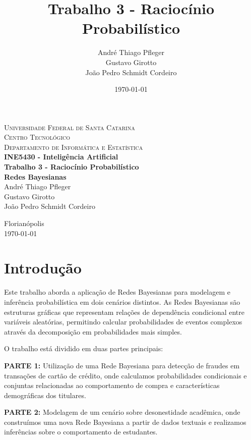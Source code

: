\documentclass[a4paper,12pt]{article}
\title{Trabalho 3 - Raciocínio Probabilístico}
\author{André Thiago Pfleger \\  Gustavo Girotto \\ João Pedro Schmidt Cordeiro}
\date{\today}
\begin{document}
\begin{titlepage}
   \begin{center}
      \textsc{Universidade Federal de Santa Catarina} \\
      \textsc{Centro Tecnológico} \\
      \textsc{Departamento de Informática e Estatística} \\[4cm]

      \textbf{\Large{INE5430 - Inteligência Artificial}} \\[2cm]

      \textbf{\huge{Trabalho 3 - Raciocínio Probabilístico} \\[0.5cm]
      \Large{Redes Bayesianas}} \\[3cm]

      André Thiago Pfleger \\
      Gustavo Girotto \\
      João Pedro Schmidt Cordeiro \\

      \vfill

      {Florianópolis} \\
      {\today}
   \end{center}
\end{titlepage}


\section{Introdução}
\label{ch:introducao}

Este trabalho aborda a aplicação de Redes Bayesianas para modelagem e inferência probabilística em dois cenários distintos. As Redes Bayesianas são estruturas gráficas que representam relações de dependência condicional entre variáveis aleatórias, permitindo calcular probabilidades de eventos complexos através da decomposição em probabilidades mais simples.

O trabalho está dividido em duas partes principais:

\textbf{PARTE 1:} Utilização de uma Rede Bayesiana para detecção de fraudes em transações de cartão de crédito, onde calculamos probabilidades condicionais e conjuntas relacionadas ao comportamento de compra e características demográficas dos titulares.

\textbf{PARTE 2:} Modelagem de um cenário sobre desonestidade acadêmica, onde construímos uma nova Rede Bayesiana a partir de dados textuais e realizamos inferências sobre o comportamento de estudantes.
\end{document}
